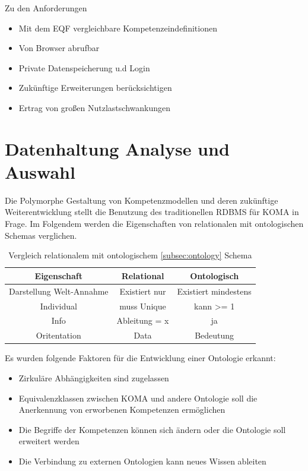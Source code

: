 \documentclass[
12pt,
english,
ngerman,
headsepline,
twoside,
openright,
numbers=noenddot,version=first
]{scrreprt}
\providecommand{\tabularnewline}{\\}
\begin{document}
Zu den Anforderungen
\begin{itemize}
\item Mit dem EQF vergleichbare Kompetenzeindefinitionen
\item Von Browser abrufbar
\item Private Datenspeicherung u.d Login
\item Zukünftige Erweiterungen berücksichtigen
\item Ertrag von großen Nutzlastschwankungen
\end{itemize}


\section{Datenhaltung Analyse und Auswahl}

Die Polymorphe Gestaltung von Kompetenzmodellen und deren zukünftige Weiterentwicklung stellt die Benutzung des traditionellen RDBMS für KOMA in Frage. Im Folgendem werden die Eigenschaften von relationalen mit ontologischen Schemas verglichen.


\begin{table}
\caption{Vergleich relationalem mit ontologischem \ref{subsec:ontology} Schema}

\centering{}
\begin{tabular}{ccc}
\noalign{\vskip\doublerulesep}
Eigenschaft & Relational & Ontologisch \tabularnewline[\doublerulesep]
\hline\noalign{\vskip\doublerulesep}
Darstellung Welt-Annahme & Existiert nur & Existiert mindestens \tabularnewline[\doublerulesep]
\noalign{\vskip\doublerulesep}
Individual & muss Unique & kann >= 1 \tabularnewline[\doublerulesep]
\noalign{\vskip\doublerulesep}
Info & Ableitung = x & ja \tabularnewline[\doublerulesep]
\noalign{\vskip\doublerulesep}
Oritentation & Data & Bedeutung \tabularnewline[\doublerulesep]

\end{tabular}
\end{table}

Es wurden folgende Faktoren für die Entwicklung einer Ontologie erkannt:
\begin{itemize}
	\item Zirkuläre Abhängigkeiten sind zugelassen
	\item Equivalenzklassen zwischen KOMA und andere Ontologie soll die Anerkennung von erworbenen Kompetenzen ermöglichen
	\item Die Begriffe der Kompetenzen können sich ändern oder die Ontologie soll erweitert werden
	\item Die Verbindung zu externen Ontologien kann neues Wissen ableiten
\end{itemize}
\end{document}
